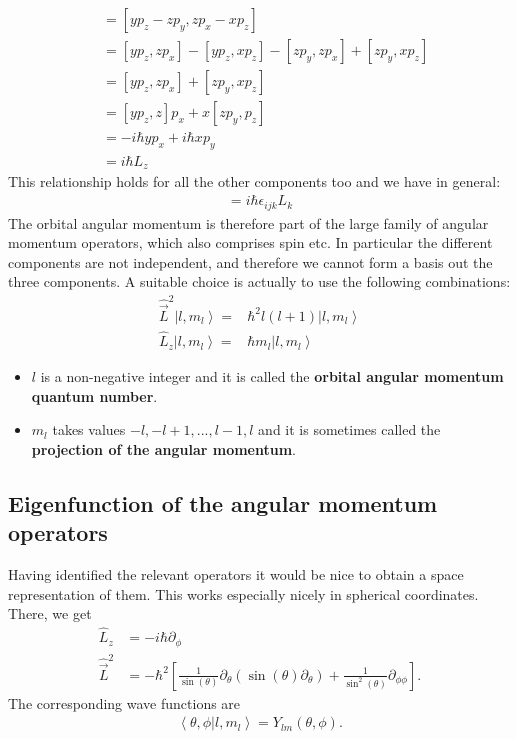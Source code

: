 \documentclass[10pt]{article}
\newcommand{\ket}[1]{\ensuremath{\left|#1\right\rangle}}
\newcommand{\braket}[1]{\ensuremath{\left\langle#1\right\rangle}}
\begin{document}
\begin{align}
[L_x, L_y] &= [yp_z - zp_y, zp_x - xp_z]\\
&=[yp_z, zp_x]-[yp_z,xp_z]- [zp_y, zp_x] + [zp_y,xp_z]\\
&=[yp_z, zp_x] + [zp_y,xp_z]\\
&=[yp_z, z]p_x +x[zp_y,p_z]\\
&=-i\hbar yp_x +i\hbar xp_y\\
&= i\hbar L_z
\end{align}
This relationship holds for all the other components too and we have in general:
\begin{align}
[L_i, L_j] = i\hbar \epsilon_{ijk}L_k
\end{align}
The orbital angular momentum is therefore part of the large family of angular momentum operators, which also comprises spin etc. In particular the different components are not independent, and therefore we cannot form a basis out the three components. A suitable choice is actually to use the following combinations: 
\begin{align}
\hat{\vec{L}}^2\ket{l,m_l} =& \hbar^2 l (l+1)\ket{l,m_l}\\
\hat{L}_z\ket{l,m_l} =& \hbar m_l \ket{l,m_l}
\end{align}
\begin{itemize}
\item $l$ is a non-negative integer and it is called the \textbf{orbital angular momentum quantum number}.
\item $m_l$ takes values $-l, -l+1, ..., l-1, l$ and it is sometimes called the \textbf{projection of the angular momentum}.
\end{itemize}

\subsection{Eigenfunction of the angular momentum operators}

Having identified the relevant operators it would be nice to obtain a space representation of them. This works especially nicely in spherical coordinates. There, we get
\begin{align}
\hat{L}_z&= - i \hbar \partial_{\phi}\\
\hat{\vec{L}}^2 &= - \hbar^2 \left[\frac{1}{\sin(\theta)}\partial_{\theta} \left( \sin(\theta) \partial_\theta\right) + \frac{1}{\sin^2(\theta)} \partial_{\phi\phi} \right].
\end{align}
The corresponding wave functions are
\begin{align}
\braket{\theta, \phi | l,m_l} = Y_{lm}(\theta,\phi).
\end{align}
\end{document}
